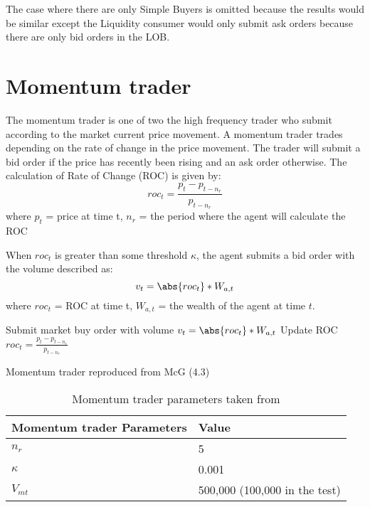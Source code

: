The case where there are only Simple Buyers is omitted because the results would be similar except the Liquidity consumer would only submit ask orders because there are only bid orders in the LOB. 


\section{Momentum trader}
The momentum trader is one of two the high frequency trader who submit according to the market current price movement. A momentum trader trades depending on the rate of change in the price movement. The trader will submit a bid order if the price has recently been rising and an ask order otherwise. The calculation of Rate of Change (ROC) is given by: 
\begin{equation}
    roc_t = \frac{p_t - p_{t-n_r}}{p_{t-n_r}}
\end{equation}
\newline where $p_t$ = price at time t, $n_r$ = the period where the agent will calculate the ROC 

\newline When $roc_t$ is greater than some threshold $\kappa$, the agent submits a bid order with the volume described as:
\begin{equation}
     v_t = \abs{roc_t} * W_{a,t} 
\end{equation}
\newline where $roc_t$ = ROC at time t, $W_{a,t}$ = the wealth of the agent at time $t$. 

\begin{algorithm}[H]
\DontPrintSemicolon 
{} {
     {
    Submit market buy order with volume $v_t = \abs{roc_t} * W_{a,t}$\;
    }
    \EndIf
  }
\EndIf
Update ROC $roc_t = \frac{p_t - p_{t-n_r}}{p_{t-n_r}}$\;  
\caption{{\sc Momentum trader reproduced from McG (4.3) \cite{McGroarty} } }
\label{algo:momentum}
\end{algorithm}

\begin{table}[h]
\centering
\begin{tabular}{ |m||p{4cm}|} 
\hline
\textbf{Momentum trader Parameters}& \textbf{Value} \\
\hline
\hline
$n_r$ & 5 \\ 
\hline
$\kappa$ & 0.001\\ 
\hline
$V_{mt}$ & 500,000 (100,000 in the test) \\ 
\hline
\end{tabular}
\caption{Momentum trader parameters taken from \cite{McGroarty}} 
\end{table}
\FloatBarrier 

